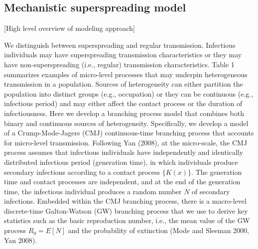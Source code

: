 \documentclass{imammb}
\numberwithin{equation}{section}
\begin{document}



\subsection{Mechanistic superspreading model}


 [High level overview of modeling approach]
 
We distinguish between superspreading and regular transmission.  Infectious individuals may have superspreading transmission characteristics or they may have non-superspreading (i.e., regular) transmission characteristics. Table 1 summarizes examples of micro-level processes that may underpin heterogeneous transmission in a population. Sources of heterogeneity can either partition the population into distinct groups (e.g., occupation) or they can be continuous (e.g., infectious period) and may either affect the contact process or the duration of infectiousness. Here we develop a branching process model that combines both binary and continuous sources of heterogeneity. Specifically, we develop a model of a Crump-Mode-Jagers (CMJ) continuous-time branching process that accounts for micro-level transmission. Following Yan (2008), at the micro-scale, the CMJ process assumes that infectious individuals have independently and identically distributed infectious period (generation time), in which individuals produce secondary infections according to a contact process $\{K(x)\}$. The generation time and contact processes are independent, and at the end of the generation time, the infectious individual produces a random number $N$ of secondary infections. Embedded within the CMJ branching process, there is a macro-level discrete-time Galton-Watson (GW) branching process that we use to derive key statistics such as the basic reproduction number, i.e., the mean value of the GW process $R_0=E[N]$ and the probability of extinction (Mode and Sleeman 2000, Yan 2008). 
\end{document}
